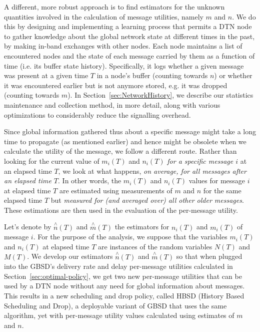 A different, more robust approach is to find estimators for the unknown quantities involved in the calculation of message utilities, namely $m$ and $n$. We do this by designing and implementing a learning process that permits a DTN node to gather knowledge about the global network state at different times in the past, by making in-band exchanges with other nodes. Each node maintains a list of encountered nodes and the state of each message carried by them as a function of time (i.e. its buffer state history). Specifically, it logs whether a given message was present at a given time $T$ in a node's buffer (counting towards $n$) or whether it was encountered earlier but is not anymore stored, e.g. it was dropped (counting towards $m$). In Section~\ref{sec:NetworkHistory}, we describe our statistics maintenance and collection method, in more detail, along with various optimizations to considerably reduce the signalling overhead.

Since global information gathered thus about a specific message might take a long time to propagate (as mentioned earlier) and hence might be obsolete when we calculate the utility of the message, we follow a different route. Rather than looking for the current value of $m_{i}(T)$ and $n_{i}(T)$ \emph{for a specific message $i$} at an elapsed time $T$, we look at what happens, \emph{on average, for all messages after an elapsed time $T$}. In other words, the $m_i(T)$ and $n_i(T)$ values for message $i$ at elapsed time $T$ are estimated using measurements of $m$ and $n$ for the same elapsed time $T$ but \emph{measured for (and averaged over) all other older messages}. These estimations are then used in the evaluation of the per-message utility.

Let's denote by $\stackrel{\wedge}{n}(T)$ and $\stackrel{\wedge}{m}(T)$ the estimators for $n_i(T)$ and $m_i(T)$ of message $i$. For the purpose of the analysis, we suppose that the variables $m_{i}(T)$ and $n_{i}(T)$ at elapsed time $T$ are instances of the random variables $N(T)$ and $M(T)$. We develop our estimators $\stackrel{\wedge}{n}(T)$ and $\stackrel{\wedge}{m}(T)$ so that when plugged into the GBSD's delivery rate and delay per-message utilities calculated in Section~\ref{sec:optimal-policy}, we get two new per-message utilities that can be used by a DTN node without any need for global information about messages. This results in a new scheduling and drop policy, called HBSD (History Based Scheduling and Drop), a deployable variant of GBSD that uses the same algorithm, yet with per-message utility values calculated using estimates of $m$ and $n$.

